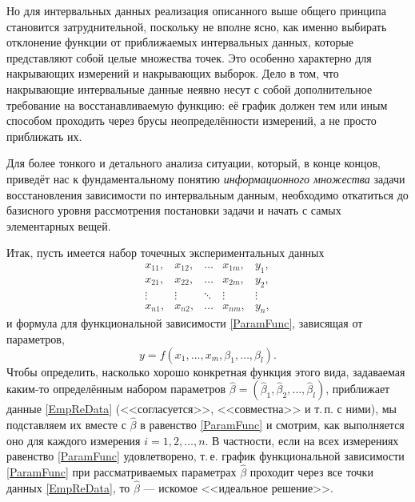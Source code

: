 \documentclass[a5paper,openany]{book}
\begin{document}
Но для интервальных данных реализация описанного выше общего принципа становится 
затруднительной, поскольку не вполне ясно, как именно выбирать отклонение функции 
от приближаемых интервальных данных, которые представляют собой целые множества точек. 
Это особенно характерно для накрывающих измерений и накрывающих выборок. Дело в том, 
что накрывающие интервальные данные неявно несут с собой дополнительное требование 
на восстанавливаемую функцию: её график должен тем или иным способом проходить через 
брусы неопределённости измерений, а не просто приближать их.  
  
Для более тонкого и детального анализа ситуации, который, в конце концов, приведёт 
нас к фундаментальному понятию \emph{информационного множества} задачи восстановления 
зависимости по интервальным данным, необходимо откатиться до базисного уровня 
рассмотрения постановки задачи и начать с самых элементарных вещей. 
  
Итак, пусть имеется набор точечных экспериментальных данных 
\begin{equation} 
\label{EmpReData} 
\begin{array}{ccccc} 
x_{11}, & x_{12}, & \ldots & x_{1m}, & y_{1}, \\ 
x_{21}, & x_{22}, & \ldots & x_{2m}, & y_{2}, \\ 
\vdots  & \vdots  & \ddots &  \vdots & \vdots \\ 
x_{n1}, & x_{n2}, & \ldots & x_{nm}, & y_{n}, 
\end{array}
\end{equation} 
и формула для функциональной зависимости \eqref{ParamFunc}, зависящая от параметров, 
\begin{equation*}
y = f(x_{1}, \ldots, x_{m}, \beta_{1}, \ldots, \beta_{l}). 
\end{equation*}
Чтобы определить, насколько хорошо конкретная функция этого вида, задаваемая каким-то 
определённым набором параметров $\hat{\beta} = (\hat{\beta}_{1}, \hat{\beta}_{2}, 
\ldots, \hat{\beta}_{l})$, приближает данные \eqref{EmpReData} (<<согласуется>>, 
<<совместна>> и т.\,п. с ними), мы подставляем их вместе с $\hat{\beta}$ в равенство 
\eqref{ParamFunc} и смотрим, как выполняется оно для каждого измерения $i = 1,2, 
\ldots, n$. В частности, если на всех измерениях равенство \eqref{ParamFunc} 
удовлетворено, т.\,е. график функциональной зависимости \eqref{ParamFunc} 
при рассматриваемых параметрах $\hat{\beta}$ проходит через все точки данных 
\eqref{EmpReData}, то $\hat{\beta}$ --- искомое <<идеальное решение>>. 
  
\end{document}
